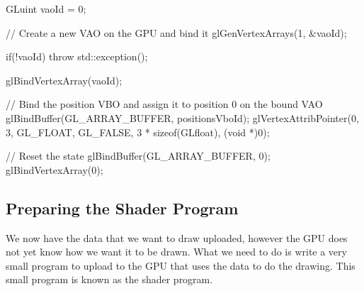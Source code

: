 \documentclass[10pt]{article}
\begin{document}
\begin{Listing}

  GLuint vaoId = 0;

  // Create a new VAO on the GPU and bind it
  glGenVertexArrays(1, &vaoId);

  if(!vaoId)
  {
    throw std::exception();
  }

  glBindVertexArray(vaoId);

  // Bind the position VBO and assign it to position 0 on the bound VAO
  glBindBuffer(GL_ARRAY_BUFFER, positionsVboId);
  glVertexAttribPointer(0, 3, GL_FLOAT, GL_FALSE, 3 * sizeof(GLfloat), (void *)0);

  // Reset the state
  glBindBuffer(GL_ARRAY_BUFFER, 0);
  glBindVertexArray(0);

\end{Listing}


\subsection*{Preparing the Shader Program}
We now have the data that we want to draw uploaded, however the GPU does
not yet know how we want it to be drawn. What we need to do is write
a very small program to upload to the GPU that uses the data to do the
drawing. This small program is known as the shader program.

\end{document}
